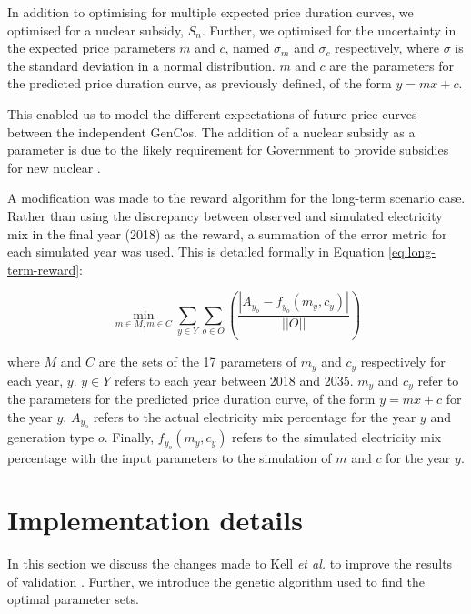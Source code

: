 In addition to optimising for multiple expected price duration curves, we optimised for a nuclear subsidy, $S_n$. Further, we optimised for the uncertainty in the expected price parameters $m$ and $c$, named $\sigma_m$ and $\sigma_c$ respectively, where $\sigma$ is the standard deviation in a normal distribution. $m$ and $c$ are the parameters for the predicted price duration curve, as previously defined, of the form $y=mx+c$.  

This enabled us to model the different expectations of future price curves between the independent GenCos. The addition of a nuclear subsidy as a parameter is due to the likely requirement for Government to provide subsidies for new nuclear \cite{Suna2016}.

A modification was made to the reward algorithm for the long-term scenario case. Rather than using the discrepancy between observed and simulated electricity mix in the final year (2018) as the reward, a summation of the error metric for each simulated year was used. This is detailed formally in Equation \ref{eq:long-term-reward}:


\begin{equation}
\label{eq:long-term-reward}
\min_{m\in M,m\in C} 
\sum\limits_{y\in Y}
\sum\limits_{o\in O}\left(
\frac{\left|A_{y_o}-f_{y_o}(m_y,c_y)\right|}
{\left|\left|O\right|\right|}
\right)
\end{equation}

\noindent where $M$ and $C$ are the sets of the 17 parameters of $m_y$ and $c_y$ respectively for each year, $y$. $y\in Y$ refers to each year between 2018 and 2035. $m_y$ and $c_y$ refer to the parameters for the predicted price duration curve, of the form $y=mx+c$ for the year $y$. $A_{y_o}$ refers to the actual electricity mix percentage for the year $y$ and generation type $o$. Finally, $f_{y_o}(m_y,c_y)$ refers to the simulated electricity mix percentage with the input parameters to the simulation of $m$ and $c$ for the year $y$.





\section{Implementation details}
\label{sec:details}

In this section we discuss the changes made to Kell \textit{et al.} to improve the results of validation \cite{Kell}. Further, we introduce the genetic algorithm used to find the optimal parameter sets.



